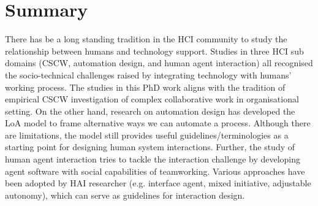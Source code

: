 

\section{Summary}


There has be a long standing tradition in the \ac{HCI} community to study the relationship between humans and technology support. Studies in three \ac{HCI} sub domains (\ac{CSCW}, automation design, and human agent interaction) all recognised the socio-technical challenges raised by integrating technology with humans' working process. The studies in this PhD work aligns with the tradition of empirical \ac{CSCW}  investigation of complex collaborative work in organisational setting. On the other hand, research on automation design has developed the \ac{LoA} model to frame alternative ways we can automate a process. Although there are limitations, the model still provides useful guidelines/terminologies as a starting point for designing human system interactions. Further, the study of human agent interaction tries to tackle the interaction challenge by developing agent software with social capabilities of teamworking. Various approaches have been adopted by \ac{HAI} researcher (e.g. interface agent, mixed initiative, adjustable autonomy), which can serve as guidelines for interaction design.\\

